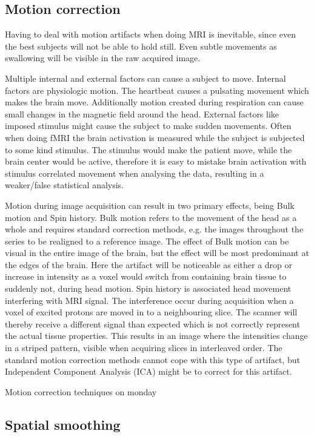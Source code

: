\subsection{Motion correction}

Having to deal with motion artifacts when doing MRI is inevitable, since even the best subjects will not be able to hold still. Even subtle movements as swallowing will be visible in the raw acquired image. 

Multiple internal and external factors can cause a subject to move. Internal factors are physiologic motion. The heartbeat causes a pulsating movement which makes the brain move. Additionally motion created during respiration can cause small changes in the magnetic field around the head. External factors like imposed stimulus might cause the subject to make sudden movements. Often when doing fMRI the brain activation is measured while the subject is subjected to some kind stimulus. The stimulus would make the patient move, while the brain center would be active, therefore it is easy to mistake brain activation with stimulus correlated movement when analysing the data, resulting in a weaker/false statistical analysis. 

Motion during image acquisition can result in two primary effects, being Bulk motion and Spin history. Bulk motion refers to the movement of the head as a whole and requires standard correction methods, e.g. the images throughout the series to be realigned to a reference image. The effect of Bulk motion can be visual in the entire image of the brain, but the effect will be most predominant at the edges of the brain. Here the artifact will be noticeable as either a drop or increase in intensity as a voxel would switch from containing brain tissue to suddenly not, during head motion.  
Spin history is associated head movement interfering with MRI signal. The interference occur during acquisition when a voxel of excited protons are moved in to a neighbouring slice. The scanner will thereby receive a different signal than expected which is not correctly represent the actual tissue properties. This results in an image where the intensities change in a striped pattern, visible when acquiring slices in interleaved order. The standard motion correction methods cannot cope with this type of artifact, but Independent Component Analysis (ICA) might be to correct for this artifact. 

Motion correction techniques on monday 

\subsection{Spatial smoothing}

